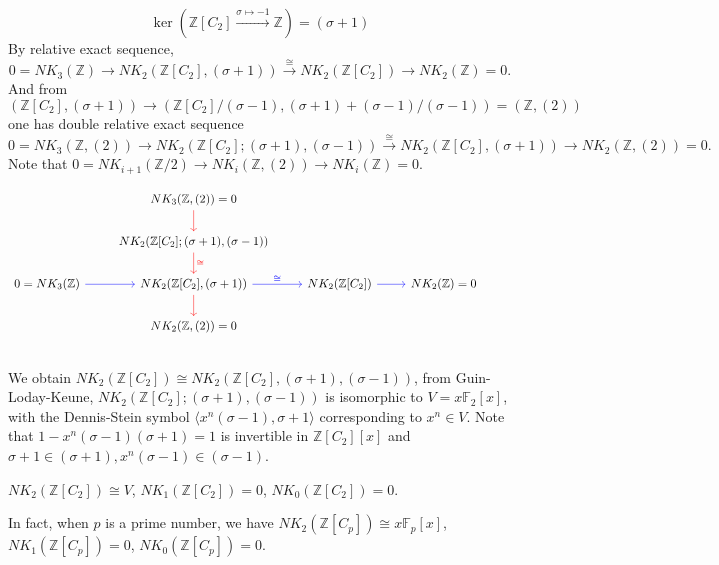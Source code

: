 \[\ker(\mathbb{Z}[C_2]\overset{\sigma \mapsto -1}\longrightarrow \mathbb{Z}) =(\sigma +1)\]
By relative exact sequence,
\[0=NK_3(\mathbb{Z})\longrightarrow NK_2(\mathbb{Z}[C_2],(\sigma+1))\overset{\cong}\longrightarrow NK_2(\mathbb{Z}[C_2])\longrightarrow NK_2(\mathbb{Z})=0.\]
And from $(\mathbb{Z}[C_2],(\sigma+1))\longrightarrow (\mathbb{Z}[C_2]/(\sigma-1),(\sigma+1)+(\sigma-1)/(\sigma-1))=(\mathbb{Z},(2))$ one has double relative exact sequence
\[0=NK_3(\mathbb{Z},(2))\longrightarrow NK_2(\mathbb{Z}[C_2];(\sigma+1),(\sigma-1))\overset{\cong}\longrightarrow NK_2(\mathbb{Z}[C_2],(\sigma+1))\longrightarrow NK_2(\mathbb{Z},(2))=0.\]
Note that $0=NK_{i+1}(\mathbb{Z}/2)\longrightarrow NK_i(\mathbb{Z},(2))\longrightarrow NK_i(\mathbb{Z})=0$.

\[\begin{tikzcd}
	 & NK_3(\mathbb{Z},(2))=0 \ar[d,red] & & & \\
	 & NK_2(\mathbb{Z}[C_2];(\sigma+1),(\sigma-1)) \ar[d,red,"\cong",red] \\
0=NK_3(\mathbb{Z})	\ar[r,blue] & NK_2(\mathbb{Z}[C_2],(\sigma+1)) \ar[r,blue,"\cong",blue] \ar[d,red] & NK_2(\mathbb{Z}[C_2]) \ar[r,blue] &NK_2(\mathbb{Z})=0\\
	& NK_2(\mathbb{Z},(2))=0 \\
\end{tikzcd}
\]
We obtain $NK_2(\mathbb{Z}[C_2])\cong NK_2(\mathbb{Z}[C_2],(\sigma+1),(\sigma-1))$, from Guin-Loday-Keune\cite{Guin-Waléry1981}, $NK_2(\mathbb{Z}[C_2];(\sigma+1),(\sigma-1))$ is isomorphic to $V=x \mathbb{F}_2[x]$, with the Dennis-Stein symbol $\langle x^n(\sigma-1),\sigma+1 \rangle$ corresponding to $x^n\in V$. Note that $1-x^n(\sigma-1)(\sigma+1)=1$ is invertible in $\mathbb{Z}[C_2][x]$ and $\sigma+1 \in (\sigma+1), x^n(\sigma-1) \in (\sigma-1)$.

\begin{theorem}
	$NK_2(\mathbb{Z}[C_2])\cong V$, $NK_1(\mathbb{Z}[C_2])=0$, $NK_0(\mathbb{Z}[C_2])=0$.
\end{theorem}

In fact, when $p$ is a prime number, we have $NK_2(\mathbb{Z}[C_p])\cong x \mathbb{F}_p[x]$, $NK_1(\mathbb{Z}[C_p])=0$, $NK_0(\mathbb{Z}[C_p])=0$.

